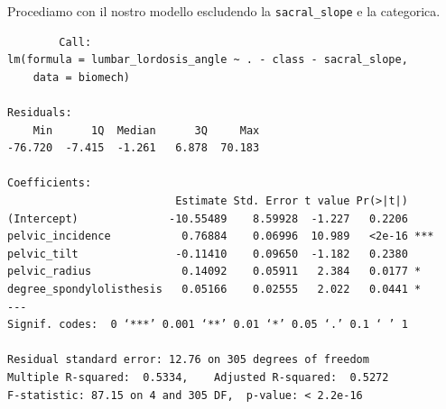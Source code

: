 \documentclass{beamer}
\newcommand{\fg}[2]{%
  \begin{center}
      \texttt{[image: \#2]}%
  \end{center}
}
\begin{document}






\begin{frame}[fragile]
	Procediamo con il nostro modello escludendo la \texttt{sacral\_slope} e la categorica.

	{\tiny
	\begin{verbatim}
		Call:
lm(formula = lumbar_lordosis_angle ~ . - class - sacral_slope, 
    data = biomech)

Residuals:
    Min      1Q  Median      3Q     Max 
-76.720  -7.415  -1.261   6.878  70.183 

Coefficients:
                          Estimate Std. Error t value Pr(>|t|)    
(Intercept)              -10.55489    8.59928  -1.227   0.2206    
pelvic_incidence           0.76884    0.06996  10.989   <2e-16 ***
pelvic_tilt               -0.11410    0.09650  -1.182   0.2380    
pelvic_radius              0.14092    0.05911   2.384   0.0177 *  
degree_spondylolisthesis   0.05166    0.02555   2.022   0.0441 *  
---
Signif. codes:  0 ‘***’ 0.001 ‘**’ 0.01 ‘*’ 0.05 ‘.’ 0.1 ‘ ’ 1

Residual standard error: 12.76 on 305 degrees of freedom
Multiple R-squared:  0.5334,	Adjusted R-squared:  0.5272 
F-statistic: 87.15 on 4 and 305 DF,  p-value: < 2.2e-16
	\end{verbatim}
	}
\end{frame}
\end{document}

